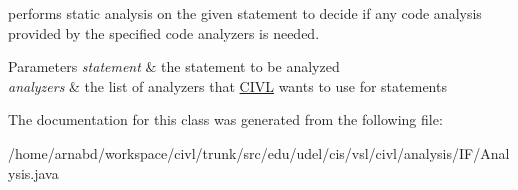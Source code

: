 performs static analysis on the given statement to decide if any code analysis provided by the specified code analyzers is needed. 


\begin{DoxyParams}{Parameters}
{\em statement} & the statement to be analyzed \\
\hline
{\em analyzers} & the list of analyzers that \hyperlink{classedu_1_1udel_1_1cis_1_1vsl_1_1civl_1_1CIVL}{C\+I\+V\+L} wants to use for statements \\
\hline
\end{DoxyParams}


The documentation for this class was generated from the following file\+:\begin{DoxyCompactItemize}
\item 
/home/arnabd/workspace/civl/trunk/src/edu/udel/cis/vsl/civl/analysis/\+I\+F/Analysis.\+java\end{DoxyCompactItemize}
